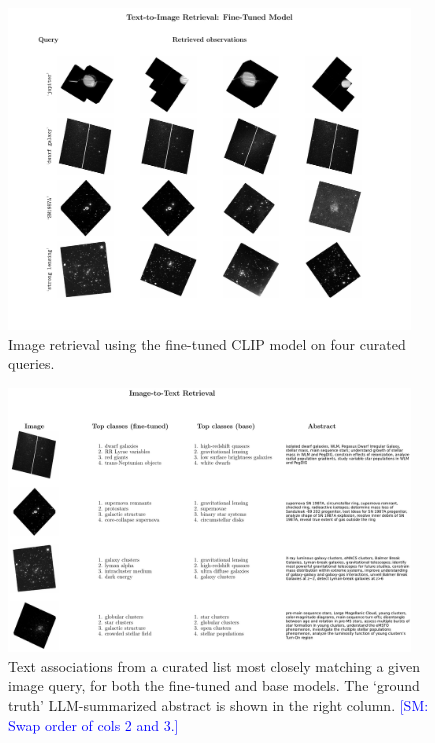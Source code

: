 \documentclass[10pt]{article} %
\newcommand{\SM}[1]{\textcolor{blue}{[SM: #1]}}
\begin{document}
\begin{figure}[!h]
\includegraphics[width=0.95\textwidth]{plots/tti.pdf}
\caption{Image retrieval using the fine-tuned CLIP model on four curated queries.}
\label{fig:tti}
\end{figure}

\begin{figure}[!h]
\includegraphics[width=0.95\textwidth]{plots/itt.pdf}
\caption{Text associations from a curated list most closely matching a given image query, for both the fine-tuned and base models. The `ground truth' LLM-summarized abstract is shown in the right column. \SM{Swap order of cols 2 and 3.}}
\label{fig:itt}
\end{figure}
\end{document}
